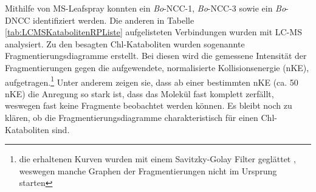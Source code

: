 \documentclass[12pt,a4paper]{article}
\begin{document}

Mithilfe von MS-Leafspray konnten ein \textit{Bo}-NCC-1, \textit{Bo}-NCC-3 sowie ein \textit{Bo}-DNCC identifiziert werden. Die anderen in Tabelle \ref{tab:LCMSKatabolitenRPListe} aufgelisteten Verbindungen wurden mit LC-MS analysiert. Zu den besagten Chl-Kataboliten wurden sogenannte Fragmentierungsdiagramme erstellt. Bei diesen wird die gemessene Intensität der Fragmentierungen gegen die aufgewendete, normalisierte Kollisionsenergie (nKE), aufgetragen.\footnote{die erhaltenen Kurven wurden mit einem Savitzky-Golay Filter geglättet \cite{scipy}, weswegen manche Graphen der Fragmentierungen nicht im Ursprung starten} Unter anderem zeigen sie, dass ab einer bestimmten nKE (ca. 50 nKE) die Anregung so stark ist, dass das Molekül fast komplett zerfällt, weswegen fast keine Fragmente beobachtet werden können. Es bleibt noch zu klären, ob die Fragmentierungsdiagramme charakteristisch für einen Chl-Kataboliten sind. 
\end{document}
